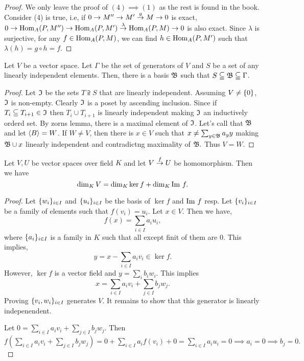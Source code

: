     \begin{proof}
        We only leave the proof of $(4) \implies (1)$ as the rest is found in the book. Consider (4) is true, i.e, if $0 \to M'' \to M' \overset{g}{\to} M \to 0$ is exact, $0 \to \mathrm{Hom}_A(P, M'') \to \mathrm{Hom}_A(P, M') \overset{\lambda}{\to} \mathrm{Hom}_A(P, M) \to 0$ is also exact. Since $\lambda$ is surjective,  for any $f \in \mathrm{Hom}_A(P, M)$, we can find $h \in \mathrm{Hom}_A(P, M')$ such that $\lambda(h) = g \circ h = f$.  
    \end{proof}

    \begin{proposition}
        Let $V$ be a vector space. Let $\Gamma$ be the set of generators of $V$ and $S$ be a set of any linearly independent elements. Then, there is a basis $\mathfrak{B}$ such that $S \subseteqq \mathfrak{B} \subseteqq \Gamma$.  
    \end{proposition}

    \begin{proof}
        Let $\mathfrak{I}$ be the sets $T \supseteqq S$ that are linearly independent. Assuming $V \neq \{0\}$, $\mathfrak{I}$ is non-empty. Clearly $\mathfrak{I}$ is a poset by ascending inclusion. Since if $T_i \subseteqq T_{i+1} \in \mathfrak{I}$ then $T_i \cup T_{i+1}$ is linearly independent making $\mathfrak{I}$ an inductively orderd set. By zorns lemma, there is a maximal element of $\mathfrak{I}$. Let's call that $\mathfrak{B}$ and let $\langle B \rangle = W$. If $W \neq V$, then there is $x \in V$ such that $x \neq \sum_{y \in \mathfrak{B}} a_y y$ making $\mathfrak{B} \cup x$ linearly independent and contradictng maximality of $\mathfrak{B}.$ Thus $V = W.$    
    \end{proof}


    \begin{proposition}
        Let $V, U$ be  vector spaces over field $K$ and let $V \overset{f}{\to} U $ be homomorphism. Then we have
        $$\dim_K V = \dim_K \ker f + \dim_K \mathrm{Im}\  f.$$ 
    \end{proposition}

    \begin{proof}
        Let $\{w_i\}_{i \in I}$ and $\{u_i\}_{i \in I}$ be the basis of $\ker f$ and $\mathrm{Im}\  f$ resp. Let $\{v_i\}_{i \in I}$ be a family of elements such that $f(v_i) = u_i.$  Let $x \in V$. Then we have,
        $$f(x) = \sum_{i \in I} a_i u_i,$$
        where $\{a_i\}_{i \in I}$ is a family in $K$ such that all except finit of them are $0$. This implies, 
        $$y = x - \sum_{i \in I} a_iv_i \in \ker f.$$
        However, $\ker f$ is a vector field and $y = \sum_i b_iw_i.$ This implies 
        $$x = \sum_{i \in I} a_i v_i + \sum_{j \in I} b_j w_j.$$
        Proving $\{v_i, w_i\}_{i \in I }$ generates $V$. It remains to show that this generator is linearly indepenendent.

        Let $0 = \sum_{i \in I} a_i v_i + \sum_{j \in I} b_j w_j.$ Then $f(\sum_{i \in I} a_i v_i + \sum_{j \in I} b_j w_j) = 0 + \sum_{i \in I} a_i f(v_i) + 0 = \sum_{i \in I} a_i u_i = 0 \implies a_i = 0 \implies b_j = 0.$
    \end{proof}

